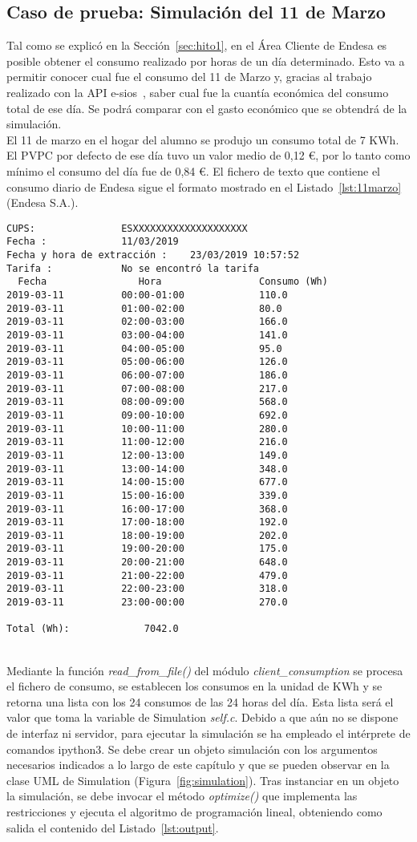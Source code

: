 \subsection{Caso de prueba: Simulación del 11 de Marzo}
Tal como se explicó en la Sección~\ref{sec:hito1}, en el Área Cliente de Endesa es posible obtener el consumo realizado por horas de un día determinado. Esto va a permitir conocer cual fue el consumo del 11 de Marzo y, gracias al trabajo realizado con la \gls{API} e-sios~\cite{Ree}, saber cual fue la cuantía económica del consumo total de ese día. Se podrá comparar con el gasto económico que se obtendrá de la simulación.\\

El 11 de marzo en el hogar del alumno se produjo un consumo total de 7 KWh. El \gls{PVPC} por defecto de ese día tuvo un valor medio de 0,12 €, por lo tanto como mínimo el consumo del día fue de 0,84 €. El fichero de texto que contiene el consumo diario de Endesa sigue el formato mostrado en el Listado~\ref{lst:11marzo} (\textcopyright Endesa S.A.).
\begin{lstlisting}[float=ht,numbers=none,caption={Fichero de consumo por horas de Endesa},label={lst:11marzo}]
CUPS:				ESXXXXXXXXXXXXXXXXXXXX
Fecha :				11/03/2019
Fecha y hora de extracción :	23/03/2019 10:57:52
Tarifa :			No se encontró la tarifa
  Fecha 			   Hora 			    Consumo (Wh)
2019-03-11			00:00-01:00				110.0
2019-03-11			01:00-02:00				80.0
2019-03-11			02:00-03:00				166.0
2019-03-11			03:00-04:00				141.0
2019-03-11			04:00-05:00				95.0
2019-03-11			05:00-06:00				126.0
2019-03-11			06:00-07:00				186.0
2019-03-11			07:00-08:00				217.0
2019-03-11			08:00-09:00				568.0
2019-03-11			09:00-10:00				692.0
2019-03-11			10:00-11:00				280.0
2019-03-11			11:00-12:00				216.0
2019-03-11			12:00-13:00				149.0
2019-03-11			13:00-14:00				348.0
2019-03-11			14:00-15:00				677.0
2019-03-11			15:00-16:00				339.0
2019-03-11			16:00-17:00				368.0
2019-03-11			17:00-18:00				192.0
2019-03-11			18:00-19:00				202.0
2019-03-11			19:00-20:00				175.0
2019-03-11			20:00-21:00				648.0
2019-03-11			21:00-22:00				479.0
2019-03-11			22:00-23:00				318.0
2019-03-11			23:00-00:00				270.0

Total (Wh):				7042.0
\end{lstlisting}
\\
Mediante la función \textit{read\_from\_file()} del módulo \textit{client\_consumption} se procesa el fichero de consumo, se establecen los consumos en la unidad de KWh y se retorna una lista con los 24 consumos de las 24 horas del día. Esta lista será el valor que toma la variable de Simulation \textit{self.c}. Debido a que aún no se dispone de interfaz ni servidor, para ejecutar la simulación se ha empleado el intérprete de comandos ipython3. Se debe crear un objeto simulación con los argumentos necesarios indicados a lo largo de este capítulo y que se pueden observar en la clase UML de Simulation (Figura~\ref{fig:simulation}). Tras instanciar en un objeto la simulación, se debe invocar el método \textit{optimize()} que implementa las restricciones y ejecuta el algoritmo de programación lineal, obteniendo como salida el contenido del Listado~\ref{lst:output}.
